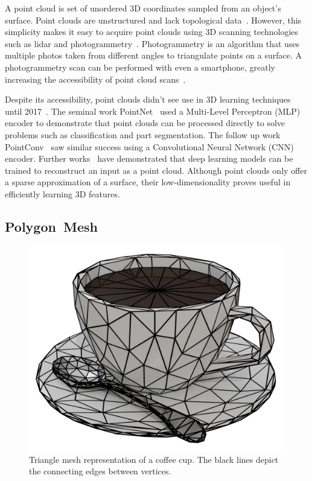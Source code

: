A point cloud is set of unordered 3D coordinates sampled from an object's surface. Point clouds are unstructured and lack topological data~\cite{Xiao2020}. However, this simplicity makes it easy to acquire point clouds using 3D scanning technologies such as lidar and photogrammetry~\cite{Leberl2010}. Photogrammetry is an algorithm that uses multiple photos taken from different angles to triangulate points on a surface. A photogrammetry scan can be performed with even a smartphone, greatly increasing the accessibility of point cloud scans~\cite{Micheletti2015}.

Despite its accessibility, point clouds didn't see use in 3D learning techniques until 2017~\cite{Xiao2020}. The seminal work PointNet~\cite{Qi2017} used a Multi-Level Perceptron (MLP) encoder to demonstrate that point clouds can be processed directly to solve problems such as classification and part segmentation. The follow up work PointConv~\cite{Wu2019} saw similar success using a Convolutional Neural Network (CNN) encoder. Further works~\cite{Fan2017, Achlioptas2018} have demonstrated that deep learning models can be trained to reconstruct an input as a point cloud. Although point clouds only offer a sparse approximation of a surface, their low-dimensionality proves useful in efficiently learning 3D features.


\subsection{Polygon~Mesh}
\label{subsec:polygon_mesh}

\begin{figure}[h]
	\centering
	\includegraphics[scale=0.2]{Images/Mesh Cup}
	\caption{Triangle mesh representation of a coffee cup. The black lines depict the connecting edges between vertices.}
	\label{fig:mesh_cup}
\end{figure}

